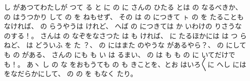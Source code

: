 し
があつてわたしが
つて
る
と
に
の
に
さんの
ひたる
とは
の
なるべきか、
の
はうつかり
して
の
を
ねもせず、
その
は
の
につきて
ㇳ
の
を
たることもなければ、
の
らうやうは
けれど、
へば
の
につきては
か
いわけの
りさうな
のする！。
さんは
の
なぞをなさつた
は
も
ければ、
に
たるほかには
は
つ
らねど、
は
どういふ
を
た
？、
の
にはまた
のやうな
があるやら？、
の
にしても
の
がある、
さんの
にも
も
い
は
るまい、
の
は
も
も
の
に
いてだけでも！。
あヽ
し
の
な
をおもうても
の
も
きことを、とお
はいろ〳〵に
へし
には
をなだらかにして、
の
の
を
もなく
たり。

